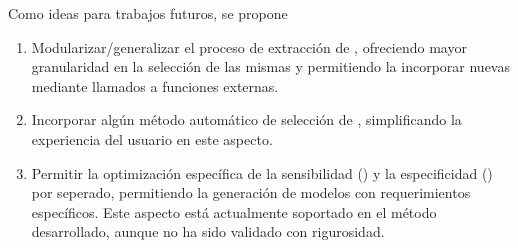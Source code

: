 %
%
%
%

Como ideas para trabajos futuros, se propone
%
\begin{enumerate}
\item
  Modularizar/generalizar el proceso de extracción de ,
  ofreciendo mayor granularidad en la selección de las mismas y
  permitiendo la incorporar nuevas  mediante llamados a
  funciones externas.
\item
  Incorporar algún método automático de selección de ,
  simplificando la experiencia del usuario en este aspecto.
\item
  Permitir la optimización específica de la sensibilidad (\SE) y la
  especificidad (\SP) por seperado, permitiendo la generación de modelos
  con requerimientos específicos.
  Este aspecto está actualmente soportado en el método desarrollado,
  aunque no ha sido validado con rigurosidad.
\end{enumerate}
%

